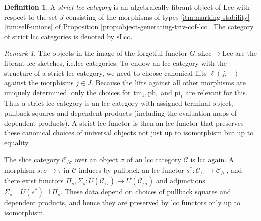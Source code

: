 \documentclass[a4paper]{article}
\theoremstyle{remark}
\newtheorem{remark}[theorem]{Remark}
\theoremstyle{definition}
\newtheorem{definition}[theorem]{Definition}
\begin{document}
\begin{definition}
  A \emph{strict lcc category} is an algebraically fibrant object of $\mathrm{Lcc}$ with respect to the set $J$ consisting of the morphisms of types \ref{itm:marking-stability} -- \ref{itm:self-unions} of Proposition \ref{prop:object-generating-triv-cof-lcc}.
  The category of strict lcc categories is denoted by $\mathrm{sLcc}$.
\end{definition}

\begin{remark}
  The objects in the image of the forgetful functor $G : \mathrm{sLcc} \rightarrow \mathrm{Lcc}$ are the fibrant lcc sketches, i.e.\@ lcc categories.
  To endow an lcc category with the structure of a strict lcc category, we need to choose canonical lifts $\ell(j, -)$ against the morphisms $j \in J$.
  Because the lifts against all other morphisms are uniquely determined, only the choices for $\mathrm{tm}_1, \mathrm{pb}_1$ and $\mathrm{pi}_1$ are relevant for this.
  Thus a strict lcc category is an lcc category with assigned terminal object, pullback squares and dependent products (including the evaluation maps of dependent products).
  A strict lcc functor is then an lcc functor that preserves these canonical choices of universal objects not just up to isomorphism but up to equality.
\end{remark}

The slice category $\mathcal{C}_{/ \sigma}$ over an object $\sigma$ of an lcc category $\mathcal{C}$ is lcc again.
A morphism $s : \sigma \rightarrow \tau$ in $\mathcal{C}$ induces by pullback an lcc functor $s^* : \mathcal{C}_{/ \tau} \rightarrow \mathcal{C}_{/ \sigma}$, and there exist functors $\Pi_s, \Sigma_s : U(\mathcal{C}_{/ \tau}) \rightarrow U(\mathcal{C}_{/ \sigma})$ and adjunctions $\Sigma_s \dashv U(s^*) \dashv \Pi_s$.
These data depend on choices of pullback squares and dependent products, and hence they are preserved by lcc functors only up to isomorphism.
\end{document}
